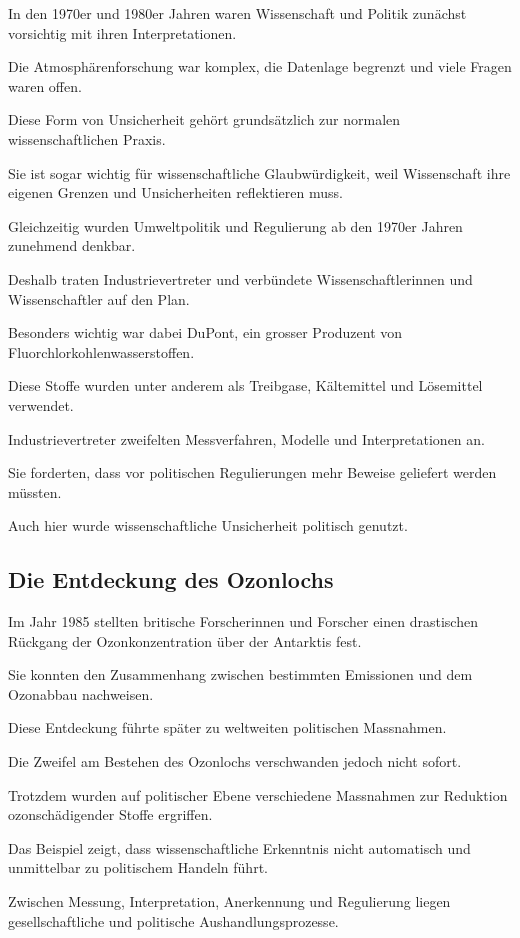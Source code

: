 In den 1970er und 1980er Jahren
waren Wissenschaft und Politik
zunächst vorsichtig mit ihren Interpretationen.

Die Atmosphärenforschung war komplex,
die Datenlage begrenzt
und viele Fragen waren offen.

Diese Form von Unsicherheit
gehört grundsätzlich zur normalen wissenschaftlichen Praxis.

Sie ist sogar wichtig
für wissenschaftliche Glaubwürdigkeit,
weil Wissenschaft ihre eigenen Grenzen
und Unsicherheiten reflektieren muss.

Gleichzeitig wurden Umweltpolitik
und Regulierung ab den 1970er Jahren
zunehmend denkbar.

Deshalb traten Industrievertreter
und verbündete Wissenschaftlerinnen und Wissenschaftler
auf den Plan.

Besonders wichtig war dabei DuPont,
ein grosser Produzent von Fluorchlorkohlenwasserstoffen.

Diese Stoffe wurden unter anderem
als Treibgase,
Kältemittel und Lösemittel verwendet.

Industrievertreter zweifelten Messverfahren,
Modelle und Interpretationen an.

Sie forderten,
dass vor politischen Regulierungen
mehr Beweise geliefert werden müssten.

Auch hier wurde wissenschaftliche Unsicherheit
politisch genutzt.

\subsection{Die Entdeckung des Ozonlochs}

Im Jahr 1985 stellten britische Forscherinnen und Forscher
einen drastischen Rückgang der Ozonkonzentration
über der Antarktis fest.

Sie konnten den Zusammenhang
zwischen bestimmten Emissionen
und dem Ozonabbau nachweisen.

Diese Entdeckung führte später
zu weltweiten politischen Massnahmen.

Die Zweifel am Bestehen des Ozonlochs
verschwanden jedoch nicht sofort.

Trotzdem wurden auf politischer Ebene
verschiedene Massnahmen zur Reduktion
ozonschädigender Stoffe ergriffen.

Das Beispiel zeigt,
dass wissenschaftliche Erkenntnis
nicht automatisch und unmittelbar
zu politischem Handeln führt.

Zwischen Messung,
Interpretation,
Anerkennung und Regulierung
liegen gesellschaftliche und politische Aushandlungsprozesse.

